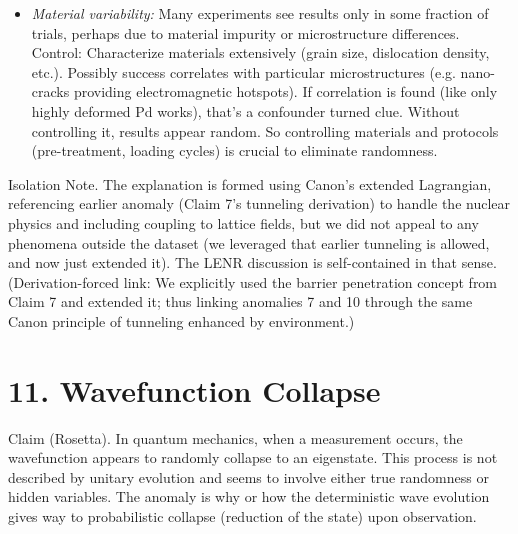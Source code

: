 \documentclass[11pt]{article}
\begin{document}
\begin{itemize}
\item 
\textit{Material variability:} Many experiments see results only in some fraction of trials, perhaps due to material impurity or microstructure differences. Control: Characterize materials extensively (grain size, dislocation density, etc.). Possibly success correlates with particular microstructures (e.g. nano-cracks providing electromagnetic hotspots). If correlation is found (like only highly deformed Pd works), that’s a confounder turned clue. Without controlling it, results appear random. So controlling materials and protocols (pre-treatment, loading cycles) is crucial to eliminate randomness.




\end{itemize}

Isolation Note. The explanation is formed using Canon’s extended Lagrangian, referencing earlier anomaly (Claim 7’s tunneling derivation) to handle the nuclear physics and including coupling to lattice fields, but we did not appeal to any phenomena outside the dataset (we leveraged that earlier tunneling is allowed, and now just extended it). The LENR discussion is self-contained in that sense. (Derivation-forced link: We explicitly used the barrier penetration concept from Claim 7 and extended it; thus linking anomalies 7 and 10 through the same Canon principle of tunneling enhanced by environment.)


\section*{11. Wavefunction Collapse}

Claim (Rosetta). In quantum mechanics, when a measurement occurs, the wavefunction appears to randomly collapse to an eigenstate. This process is not described by unitary evolution and seems to involve either true randomness or hidden variables. The anomaly is why or how the deterministic wave evolution gives way to probabilistic collapse (reduction of the state) upon observation.
\end{document}
